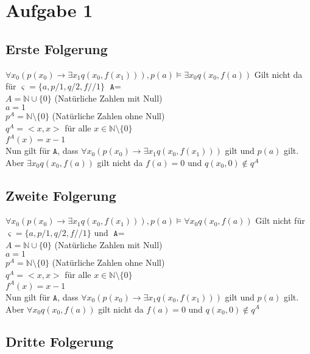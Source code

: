\section*{Aufgabe 1}

\subsection*{Erste Folgerung}

$\forall x_0 (p(x_0) \rightarrow \exists x_1 q(x_0, f(x_1))), p(a) \vDash \exists x_0 q(x_0, f(a))$ Gilt nicht da für $\varsigma = \{a,p/1, q/2, f//1 \}$ $\texttt{A}=$\\
$A=\mathbb{N} \cup \{0\}$ (Natürliche Zahlen mit Null)\\
$a=1$\\
$p^A =  \mathbb{N} \setminus \{0\}$ (Natürliche Zahlen ohne Null) \\
$q^A = <x,x>$ für alle $x\in \mathbb{N}\setminus \{0\}$\\
$f^A(x) = x-1$\\

Nun gilt für $\texttt{A}$, dass $\forall x_0 (p(x_0) \rightarrow \exists x_1 q(x_0, f(x_1)))$ gilt und $ p(a)$ gilt. Aber $\exists x_0 q(x_0,f(a))$ gilt nicht da $f(a)=0$ und $q(x_0,0) \not \in q^A$

\subsection*{Zweite Folgerung}

$\forall x_0 (p(x_0) \rightarrow \exists x_1 q(x_0, f(x_1))), p(a) \vDash \forall x_0 q(x_0, f(a))$ Gilt nicht für $\varsigma = \{a,p/1, q/2, f//1 \}$ und $\texttt{A}=$\\
$A=\mathbb{N} \cup \{0\}$ (Natürliche Zahlen mit Null)\\
$a=1$\\
$p^A =  \mathbb{N} \setminus \{0\}$ (Natürliche Zahlen ohne Null) \\
$q^A = <x,x>$ für alle $x\in \mathbb{N}\setminus \{0\}$\\
$f^A(x) = x-1$\\

Nun gilt für $\texttt{A}$, dass $\forall x_0 (p(x_0) \rightarrow \exists x_1 q(x_0, f(x_1)))$ gilt und $ p(a)$ gilt. Aber $\forall x_0 q(x_0,f(a))$ gilt nicht da $f(a)=0$ und $q(x_0,0) \not \in q^A$

\subsection*{Dritte Folgerung}

